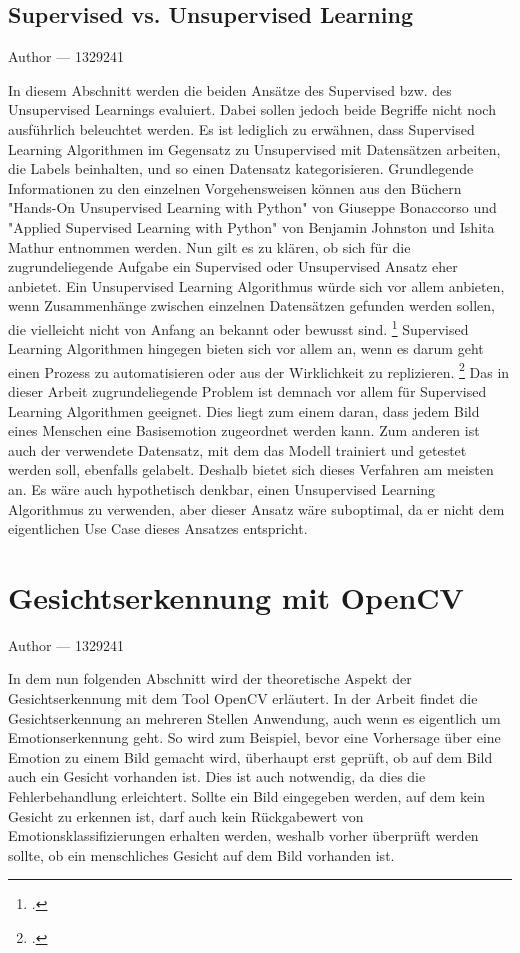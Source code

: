 \documentclass[12pt, a4paper]{report}
\makeatletter
\newcommand{\sectionauthor}[1]{%
  {\parindent0pt\vspace*{-5pt}%
  \large{Author --- }
  \linespread{1.1}\large\scshape#1%
  \par\nobreak\vspace*{35pt} }
  \@afterheading%
}
\makeatother
\begin{document}
\subsection{Supervised vs. Unsupervised Learning}
\sectionauthor{1329241}
In diesem Abschnitt werden die beiden Ansätze des Supervised bzw. des Unsupervised Learnings evaluiert. Dabei sollen jedoch beide Begriffe nicht noch ausführlich beleuchtet werden. Es ist lediglich zu erwähnen, dass Supervised Learning Algorithmen im Gegensatz zu Unsupervised mit Datensätzen arbeiten, die Labels beinhalten, und so einen Datensatz kategorisieren. Grundlegende Informationen zu den einzelnen Vorgehensweisen können aus den Büchern "Hands-On Unsupervised Learning with Python" von Giuseppe Bonaccorso und "Applied Supervised Learning with Python" von Benjamin Johnston und Ishita Mathur entnommen werden. Nun gilt es zu klären, ob sich für die zugrundeliegende Aufgabe ein Supervised oder Unsupervised Ansatz eher anbietet. Ein Unsupervised Learning Algorithmus würde sich vor allem anbieten, wenn Zusammenhänge zwischen einzelnen Datensätzen gefunden werden sollen, die vielleicht nicht von Anfang an bekannt oder bewusst sind.
\footcite[Vgl. ][21]{Unsupervised}
Supervised Learning Algorithmen hingegen bieten sich vor allem an, wenn es darum geht einen Prozess zu automatisieren oder aus der Wirklichkeit zu replizieren.
\footcite[Vgl. ][4]{Supervised}
Das in dieser Arbeit zugrundeliegende Problem ist demnach vor allem für Supervised Learning Algorithmen geeignet. Dies liegt zum einem daran, dass jedem Bild eines Menschen eine Basisemotion zugeordnet werden kann. Zum anderen ist auch der verwendete Datensatz, mit dem das Modell trainiert und getestet werden soll, ebenfalls gelabelt. Deshalb bietet sich dieses Verfahren am meisten an. Es wäre auch hypothetisch denkbar, einen Unsupervised Learning Algorithmus zu verwenden, aber dieser Ansatz wäre suboptimal, da er nicht dem eigentlichen Use Case dieses Ansatzes entspricht.

\section{Gesichtserkennung mit OpenCV}
\sectionauthor{1329241}
In dem nun folgenden Abschnitt wird der theoretische Aspekt der Gesichtserkennung mit dem Tool OpenCV erläutert. In der Arbeit findet die Gesichtserkennung an mehreren Stellen Anwendung, auch wenn es eigentlich um Emotionserkennung geht. So wird zum Beispiel, bevor eine Vorhersage über eine Emotion zu einem Bild gemacht wird, überhaupt erst geprüft, ob auf dem Bild auch ein Gesicht vorhanden ist. Dies ist auch notwendig, da dies die Fehlerbehandlung erleichtert. Sollte ein Bild eingegeben werden, auf dem kein Gesicht zu erkennen ist, darf auch kein Rückgabewert von Emotionsklassifizierungen erhalten werden, weshalb vorher überprüft werden sollte, ob ein menschliches Gesicht auf dem Bild vorhanden ist.
\end{document}
